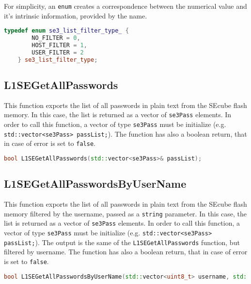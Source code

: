 For simplicity, an \texttt{enum} creates a correspondence between the numerical value and it's intrinsic information, provided by the name.
\begin{lstlisting}[language=C++,breaklines=true]
	typedef enum se3_list_filter_type_ {
		NO_FILTER = 0,
		HOST_FILTER = 1,
		USER_FILTER = 2
	} se3_list_filter_type;
\end{lstlisting}

\subsection{L1SEGetAllPasswords}
This function exports the list of all passwords in plain text from the SEcube flash memory. In this case, the list is returned as a vector of \texttt{se3Pass} elements. In order to call this function, a vector of type \texttt{se3Pass} must be initialize (e.g. \texttt{std::vector<se3Pass> passList;}).\newline\newline
The function has also a boolean return, that in case of error is set to \texttt{false}.

\begin{lstlisting}[language=C++,breaklines=true]
	bool L1SEGetAllPasswords(std::vector<se3Pass>& passList);
\end{lstlisting}

\subsection{L1SEGetAllPasswordsByUserName}
This function exports the list of all passwords in plain text from the SEcube flash memory filtered by the username, passed as a \texttt{string} parameter. In this case, the list is returned as a vector of \texttt{se3Pass} elements. In order to call this function, a vector of type \texttt{se3Pass} must be initialize (e.g. \texttt{std::vector<se3Pass> passList;}).\newline\newline
The output is the same of the \texttt{L1SEGetAllPasswords} function, but filtered by username.\newline\newline
The function has also a boolean return, that in case of error is set to \texttt{false}.

\begin{lstlisting}[language=C++,breaklines=true]
	bool L1SEGetAllPasswordsByUserName(std::vector<uint8_t> username, std::vector<se3Pass>& passList);
\end{lstlisting}

